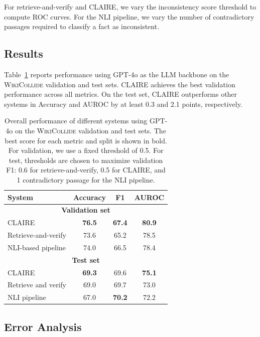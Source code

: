\documentclass[11pt]{article}
\newcommand{\dataset}[0]{\textsc{WikiCollide}\xspace}
\newcommand{\system}[0]{\textsc{CLAIRE}\xspace}
\begin{document}
For retrieve-and-verify and \system, we vary the inconsistency score threshold to compute ROC curves. For the NLI pipeline, we vary the number of contradictory passages required to classify a fact as inconsistent.

\subsection{Results}
Table~\ref{tab:results_main} reports performance using GPT-4o as the LLM backbone on the \dataset validation and test sets. \system achieves the best validation performance across all metrics. On the test set, \system outperforms other systems in Accuracy and AUROC by at least 0.3 and 2.1 points, respectively.

\begin{table}[ht!]
\centering
\small
\begin{tabular}{lccc}
    \toprule
    \textbf{System} & \textbf{Accuracy}  & \textbf{F1} & \textbf{AUROC} \\
    \midrule
    \multicolumn{4}{c}{\textbf{Validation set}} \\
    \system & \textbf{76.5} &  \textbf{67.4} & \textbf{80.9}  \\
    Retrieve-and-verify & 73.6 & 65.2 & 78.5 \\
    NLI-based pipeline & 74.0 & 66.5 & 78.4 \\
    \midrule
    \multicolumn{4}{c}{\textbf{Test set}} \\
    \system & \textbf{69.3} & 69.6 & \textbf{75.1} \\
    Retrieve and verify & 69.0 &  69.7 & 73.0 \\
    NLI pipeline & 67.0 & \textbf{70.2} & 72.2 \\
    \bottomrule
\end{tabular}

\caption{Overall performance of different systems using GPT-4o on the \dataset validation and test sets. The best score for each metric and split is shown in bold. For validation, we use a fixed threshold of 0.5. For test, thresholds are chosen to maximize validation F1: 0.6 for retrieve-and-verify, 0.5 for \system, and 1 contradictory passage for the NLI pipeline.}
\label{tab:results_main}
\end{table}



\subsection{Error Analysis}
\end{document}
